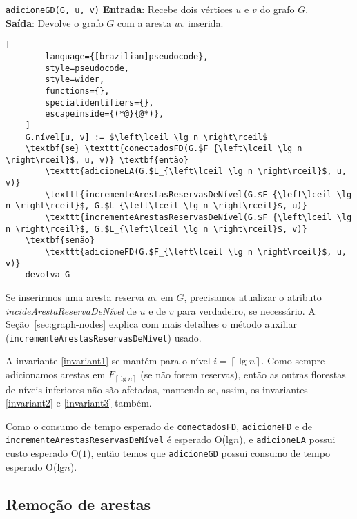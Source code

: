 \begin{programruledcaption}{\texttt{adicioneGD(G, u, v)} \label{prog:addGD}}
    \noindent\textbf{Entrada}: Recebe dois vértices $u$ e $v$ do grafo $G$. \\
    \textbf{Saída}: Devolve o grafo $G$ com a aresta $uv$ inserida.
    \vspace{-0.5\baselineskip}
    \begin{lstlisting}[
        language={[brazilian]pseudocode},
        style=pseudocode,
        style=wider,
        functions={},
        specialidentifiers={},
        escapeinside={(*@}{@*)},
    ]
    G.nível[u, v] := $\left\lceil \lg n \right\rceil$
    \textbf{se} \texttt{conectadosFD(G.$F_{\left\lceil \lg n \right\rceil}$, u, v)} \textbf{então}
        \texttt{adicioneLA(G.$L_{\left\lceil \lg n \right\rceil}$, u, v)}
        \texttt{incrementeArestasReservasDeNível(G.$F_{\left\lceil \lg n \right\rceil}$, G.$L_{\left\lceil \lg n \right\rceil}$, u)}
        \texttt{incrementeArestasReservasDeNível(G.$F_{\left\lceil \lg n \right\rceil}$, G.$L_{\left\lceil \lg n \right\rceil}$, v)}
    \textbf{senão}
        \texttt{adicioneFD(G.$F_{\left\lceil \lg n \right\rceil}$, u, v)}
    devolva G
    \end{lstlisting}
    \vspace{-0.5\baselineskip}
\end{programruledcaption}

Se inserirmos uma aresta reserva $uv$ em $G$, precisamos atualizar o atributo \textit{incideArestaReservaDeNível} de $u$ e de $v$ para verdadeiro, se necessário. A Seção~\ref{sec:graph-nodes} explica com mais detalhes o método auxiliar (\texttt{incrementeArestasReservasDeNível}) usado. 

A invariante \ref{invariant1} se mantém para o nível $i = \left\lceil \lg n \right\rceil$. Como sempre adicionamos arestas em $F_{\left\lceil \lg n \right\rceil}$ (se não forem reservas), então as outras florestas de níveis inferiores não são afetadas, mantendo-se, assim, os invariantes \ref{invariant2} e \ref{invariant3} também.

Como o consumo de tempo esperado de \texttt{conectadosFD}, \texttt{adicioneFD} e de \texttt{incrementeArestasReservasDeNível} é esperado O(lg$n$), e \texttt{adicioneLA} possui custo esperado O($1$), então temos que \texttt{adicioneGD} possui consumo de tempo esperado O(lg$n$).

\subsection{Remoção de arestas}
\label{sec:code-edge-removal}


